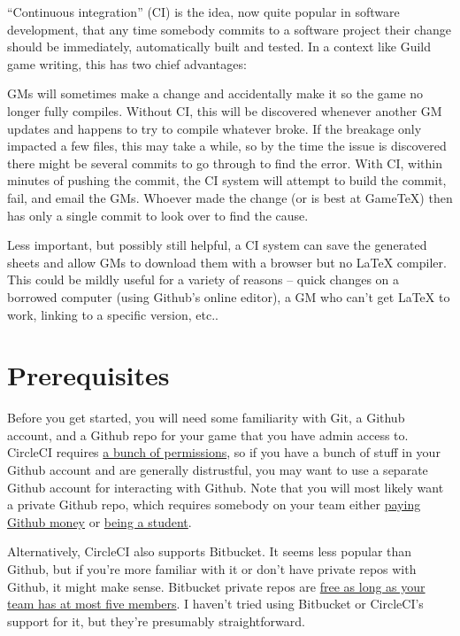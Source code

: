 \documentclass[green]{testgame}
\begin{document}
``Continuous integration'' (CI) is the idea, now quite popular in software development, that any time somebody commits to a software project their change should be immediately, automatically built and tested. In a context like Guild game writing, this has two chief advantages:
\begin{desc}
\item[Finding compile errors quickly] GMs will sometimes make a change and accidentally make it so the game no longer fully compiles. Without CI, this will be discovered whenever another GM updates and happens to try to compile whatever broke. If the breakage only impacted a few files, this may take a while, so by the time the issue is discovered there might be several commits to go through to find the error. With CI, within minutes of pushing the commit, the CI system will attempt to build the commit, fail, and email the GMs. Whoever made the change (or is best at GameTeX) then has only a single commit to look over to find the cause.
\item[Downloadable sheets without \LaTeX] Less important, but possibly still helpful, a CI system can save the generated sheets and allow GMs to download them with a browser but no \LaTeX{} compiler. This could be mildly useful for a variety of reasons -- quick changes on a borrowed computer (using Github's online editor), a GM who can't get \LaTeX{} to work, linking to a specific version, etc..
\end{desc}

\section{Prerequisites}

Before you get started, you will need some familiarity with Git, a Github account, and a Github repo for your game that you have admin access to. CircleCI requires \href{https://circleci.com/docs/github-permissions/}{a bunch of permissions}, so if you have a bunch of stuff in your Github account and are generally distrustful, you may want to use a separate Github account for interacting with Github. Note that you will most likely want a private Github repo, which requires somebody on your team either \href{https://github.com/pricing}{paying Github money} or \href{https://education.github.com/pack}{being a student}.

Alternatively, CircleCI also supports Bitbucket. It seems less popular than Github, but if you're more familiar with it or don't have private repos with Github, it might make sense. Bitbucket private repos are \href{https://bitbucket.org/product/pricing?tab=host-in-the-cloud}{free as long as your team has at most five members}. I haven't tried using Bitbucket or CircleCI's support for it, but they're presumably straightforward.
\end{document}
